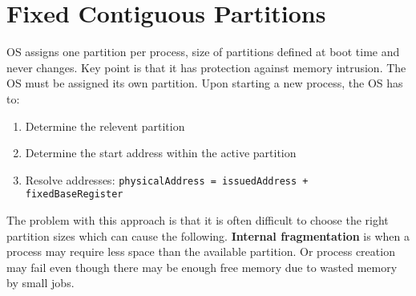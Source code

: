 \documentclass[11pt]{article}
\begin{document}
\section{Fixed Contiguous Partitions}
\label{sec:orga3044a0}
OS assigns one partition per process, size of partitions defined at boot time and never changes.
Key point is that it has protection against memory intrusion.
The OS must be assigned its own partition.
Upon starting a new process, the OS has to:
\begin{enumerate}
\item Determine the relevent partition
\item Determine the start address within the active partition
\item Resolve addresses: \texttt{physicalAddress = issuedAddress + fixedBaseRegister}
\end{enumerate}
The problem with this approach is that it is often difficult to choose the right partition sizes which can cause the following.
\textbf{Internal fragmentation} is when a process may require less space than the available partition.
Or process creation may fail even though there may be enough free memory due to wasted memory by small jobs.
\end{document}

